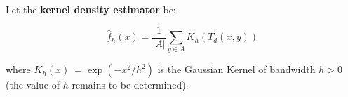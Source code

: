 Let the \textbf{ kernel density estimator} be:

\[   \hat{f}_h(x) = \frac{1}{|A|}\sum_{ y \in A} K_h (T_d(x,y))  \]

 where $K_h(x) ~= \exp( -x^2/h^2)$ is the Gaussian Kernel of bandwidth $h>0$ (the value of $h$ remains to be determined).


